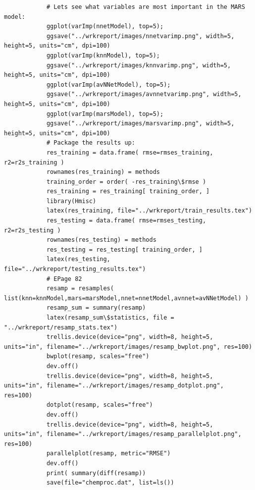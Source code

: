 \documentclass[letterpaper,12pt,titlepage,oneside,final]{report}
\begin{document}
\begin{multicols}{2}
\begin{verbatim}
            # Lets see what variables are most important in the MARS model: 
            ggplot(varImp(nnetModel), top=5);
            ggsave("../wrkreport/images/nnetvarimp.png", width=5, height=5, units="cm", dpi=100)
            ggplot(varImp(knnModel), top=5);
            ggsave("../wrkreport/images/knnvarimp.png", width=5, height=5, units="cm", dpi=100)
            ggplot(varImp(avNNetModel), top=5);
            ggsave("../wrkreport/images/avnnetvarimp.png", width=5, height=5, units="cm", dpi=100)
            ggplot(varImp(marsModel), top=5);
            ggsave("../wrkreport/images/marsvarimp.png", width=5, height=5, units="cm", dpi=100)
            # Package the results up:
            res_training = data.frame( rmse=rmses_training, r2=r2s_training )
            rownames(res_training) = methods
            training_order = order( -res_training\$rmse )
            res_training = res_training[ training_order, ]
            library(Hmisc)
            latex(res_training, file="../wrkreport/train_results.tex")
            res_testing = data.frame( rmse=rmses_testing, r2=r2s_testing )
            rownames(res_testing) = methods
            res_testing = res_testing[ training_order, ]
            latex(res_testing, file="../wrkreport/testing_results.tex")
            # EPage 82 
            resamp = resamples( list(knn=knnModel,mars=marsModel,nnet=nnetModel,avnnet=avNNetModel) )
            resamp_sum = summary(resamp)
            latex(resamp_sum\$statistics, file = "../wrkreport/resamp_stats.tex")
            trellis.device(device="png", width=8, height=5, units="in", filename="../wrkreport/images/resamp_bwplot.png", res=100)
            bwplot(resamp, scales="free")
            dev.off()
            trellis.device(device="png", width=8, height=5, units="in", filename="../wrkreport/images/resamp_dotplot.png", res=100)
            dotplot(resamp, scales="free")
            dev.off()
            trellis.device(device="png", width=8, height=5, units="in", filename="../wrkreport/images/resamp_parallelplot.png", res=100)
            parallelplot(resamp, metric="RMSE")
            dev.off()
            print( summary(diff(resamp)) 
            save(file="chemproc.dat", list=ls())
        \end{verbatim}
        \end{multicols}
        \clearpage
\end{document}
